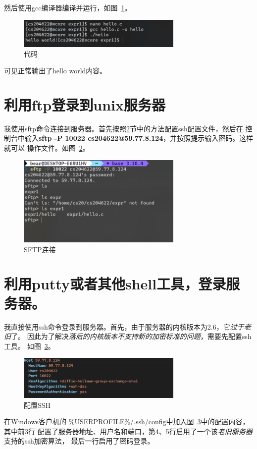 \documentclass[a4paper,twoside]{article}
\begin{document}
\begin{spacing}{1.2}
然后使用gcc编译器编译并运行，如图~\ref{fig:cmp_run}。

\begin{figure}[htb]
	\centering
	\includegraphics[width=8.0cm]{hello.png}
	\caption{代码}
	\label{fig:cmp_run}
\end{figure}

可见正常输出了hello world内容。

\section{利用ftp登录到unix服务器}

我使用sftp命令连接到服务器。首先按照\ref{sec:ssh}节中的方法配置ssh配置文件，然后在
控制台中输入\textbf{sftp -P 10022 cs204622@59.77.8.124}，并按照提示输入密码。这样就可以
操作文件。如图~\ref{fig:sftp}。
\begin{figure}[htb]
	\centering
	\includegraphics[width=8.0cm]{sftp.png}
	\caption{SFTP连接}
	\label{fig:sftp}
\end{figure}

\section{利用putty或者其他shell工具，登录服务器。}
\label{sec:ssh}

我直接使用ssh命令登录到服务器。首先，由于服务器的内核版本为2.6，它\emph{过于老旧}了。
因此为了解决\emph{落后的内核版本不支持新的加密标准的问题}，需要先配置ssh工具。
如图~\ref{fig:sshconf}。
\begin{figure}[htb]
	\centering
	\includegraphics[width=8.0cm]{sshconf.png}
	\caption{配置SSH}
	\label{fig:sshconf}
\end{figure}
在Windows客户机的
\%USERPROFILE\%/.ssh/config中加入图~\ref{fig:sshconf}中的配置内容，其中前3行
配置了服务器地址、用户名和端口，第4、5行启用了一个该\emph{老旧服务器}支持的ssh加密算法，
最后一行启用了密码登录。


\end{spacing}
\end{document}
